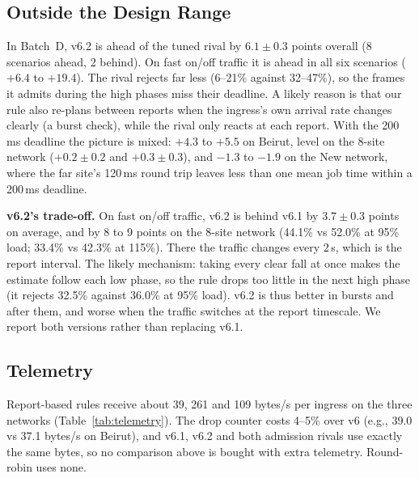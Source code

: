 \documentclass[conference]{IEEEtran}
\begin{document}
\subsection{Outside the Design Range}
In Batch~D, v6.2 is ahead of the tuned rival by $6.1 \pm 0.3$ points overall (8 scenarios ahead, 2 behind). On fast on/off traffic it is ahead in all six scenarios ($+6.4$ to $+19.4$). The rival rejects far less (6--21\% against 32--47\%), so the frames it admits during the high phases miss their deadline. A likely reason is that our rule also re-plans between reports when the ingress's own arrival rate changes clearly (a burst check), while the rival only reacts at each report. With the 200\,ms deadline the picture is mixed: $+4.3$ to $+5.5$ on Beirut, level on the 8-site network ($+0.2 \pm 0.2$ and $+0.3 \pm 0.3$), and $-1.3$ to $-1.9$ on the New network, where the far site's 120\,ms round trip leaves less than one mean job time within a 200\,ms deadline.

\textbf{v6.2's trade-off.} On fast on/off traffic, v6.2 is behind v6.1 by $3.7 \pm 0.3$ points on average, and by 8 to 9 points on the 8-site network (44.1\% vs 52.0\% at 95\% load; 33.4\% vs 42.3\% at 115\%). There the traffic changes every 2\,s, which is the report interval. The likely mechanism: taking every clear fall at once makes the estimate follow each low phase, so the rule drops too little in the next high phase (it rejects 32.5\% against 36.0\% at 95\% load). v6.2 is thus better in bursts and after them, and worse when the traffic switches at the report timescale. We report both versions rather than replacing v6.1.

\subsection{Telemetry}
Report-based rules receive about 39, 261 and 109 bytes/s per ingress on the three networks (Table~\ref{tab:telemetry}). The drop counter costs 4--5\% over v6 (e.g., 39.0 vs 37.1 bytes/s on Beirut), and v6.1, v6.2 and both admission rivals use exactly the same bytes, so no comparison above is bought with extra telemetry. Round-robin uses none.

\end{document}
